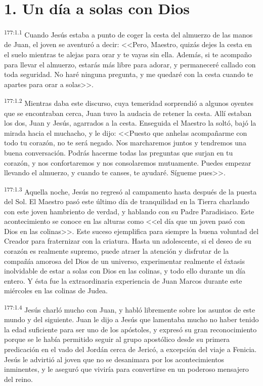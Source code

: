 \section*{1. Un día a solas con Dios}
\par 
\textsuperscript{177:1.1} Cuando Jesús estaba a punto de coger la cesta del almuerzo de las manos de Juan, el joven se aventuró a decir: <<Pero, Maestro, quizás dejes la cesta en el suelo mientras te alejas para orar y te vayas sin ella. Además, si te acompaño para llevar el almuerzo, estarás más libre para adorar, y permaneceré callado con toda seguridad. No haré ninguna pregunta, y me quedaré con la cesta cuando te apartes para orar a solas>>.

\par 
\textsuperscript{177:1.2} Mientras daba este discurso, cuya temeridad sorprendió a algunos oyentes que se encontraban cerca, Juan tuvo la audacia de retener la cesta. Allí estaban los dos, Juan y Jesús, agarrados a la cesta. Enseguida el Maestro la soltó, bajó la mirada hacia el muchacho, y le dijo: <<Puesto que anhelas acompañarme con todo tu corazón, no te será negado. Nos marcharemos juntos y tendremos una buena conversación. Podrás hacerme todas las preguntas que surjan en tu corazón, y nos confortaremos y nos consolaremos mutuamente. Puedes empezar llevando el almuerzo, y cuando te canses, te ayudaré. Sígueme pues>>.

\par 
\textsuperscript{177:1.3} Aquella noche, Jesús no regresó al campamento hasta después de la puesta del Sol. El Maestro pasó este último día de tranquilidad en la Tierra charlando con este joven hambriento de verdad, y hablando con su Padre Paradisiaco. Este acontecimiento se conoce en las alturas como <<el día que un joven pasó con Dios en las colinas>>. Este suceso ejemplifica para siempre la buena voluntad del Creador para fraternizar con la criatura. Hasta un adolescente, si el deseo de su corazón es realmente supremo, puede atraer la atención y disfrutar de la compañía amorosa del Dios de un universo, experimentar realmente el éxtasis inolvidable de estar a solas con Dios en las colinas, y todo ello durante un día entero. Y ésta fue la extraordinaria experiencia de Juan Marcos durante este miércoles en las colinas de Judea.

\par 
\textsuperscript{177:1.4} Jesús charló mucho con Juan, y habló libremente sobre los asuntos de este mundo y del siguiente. Juan le dijo a Jesús que lamentaba mucho no haber tenido la edad suficiente para ser uno de los apóstoles, y expresó su gran reconocimiento porque se le había permitido seguir al grupo apostólico desde su primera predicación en el vado del Jordán cerca de Jericó, a excepción del viaje a Fenicia. Jesús le advirtió al joven que no se desanimara por los acontecimientos inminentes, y le aseguró que viviría para convertirse en un poderoso mensajero del reino.

